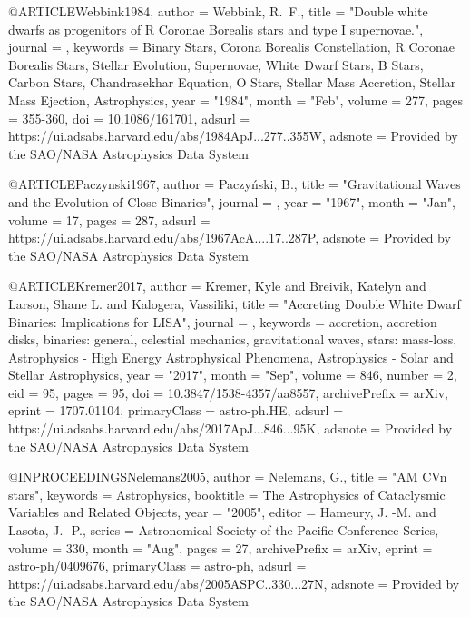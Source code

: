 \documentclass[twocolumn,tighten]{aastex63}
\begin{document}
@ARTICLE{Webbink1984,
       author = {{Webbink}, R.~F.},
        title = "{Double white dwarfs as progenitors of R Coronae Borealis stars and type I supernovae.}",
      journal = {\apj},
     keywords = {Binary Stars, Corona Borealis Constellation, R Coronae Borealis Stars, Stellar Evolution, Supernovae, White Dwarf Stars, B Stars, Carbon Stars, Chandrasekhar Equation, O Stars, Stellar Mass Accretion, Stellar Mass Ejection, Astrophysics},
         year = "1984",
        month = "Feb",
       volume = {277},
        pages = {355-360},
          doi = {10.1086/161701},
       adsurl = {https://ui.adsabs.harvard.edu/abs/1984ApJ...277..355W},
      adsnote = {Provided by the SAO/NASA Astrophysics Data System}
}

@ARTICLE{Paczynski1967,
       author = {{Paczy{\'n}ski}, B.},
        title = "{Gravitational Waves and the Evolution of Close Binaries}",
      journal = {\actaa},
         year = "1967",
        month = "Jan",
       volume = {17},
        pages = {287},
       adsurl = {https://ui.adsabs.harvard.edu/abs/1967AcA....17..287P},
      adsnote = {Provided by the SAO/NASA Astrophysics Data System}
}

@ARTICLE{Kremer2017,
       author = {{Kremer}, Kyle and {Breivik}, Katelyn and {Larson}, Shane L. and
         {Kalogera}, Vassiliki},
        title = "{Accreting Double White Dwarf Binaries: Implications for LISA}",
      journal = {\apj},
     keywords = {accretion, accretion disks, binaries: general, celestial mechanics, gravitational waves, stars: mass-loss, Astrophysics - High Energy Astrophysical Phenomena, Astrophysics - Solar and Stellar Astrophysics},
         year = "2017",
        month = "Sep",
       volume = {846},
       number = {2},
          eid = {95},
        pages = {95},
          doi = {10.3847/1538-4357/aa8557},
archivePrefix = {arXiv},
       eprint = {1707.01104},
 primaryClass = {astro-ph.HE},
       adsurl = {https://ui.adsabs.harvard.edu/abs/2017ApJ...846...95K},
      adsnote = {Provided by the SAO/NASA Astrophysics Data System}
}

@INPROCEEDINGS{Nelemans2005,
       author = {{Nelemans}, G.},
        title = "{AM CVn stars}",
     keywords = {Astrophysics},
    booktitle = {The Astrophysics of Cataclysmic Variables and Related Objects},
         year = "2005",
       editor = {{Hameury}, J. -M. and {Lasota}, J. -P.},
       series = {Astronomical Society of the Pacific Conference Series},
       volume = {330},
        month = "Aug",
        pages = {27},
archivePrefix = {arXiv},
       eprint = {astro-ph/0409676},
 primaryClass = {astro-ph},
       adsurl = {https://ui.adsabs.harvard.edu/abs/2005ASPC..330...27N},
      adsnote = {Provided by the SAO/NASA Astrophysics Data System}
}
\end{document}
